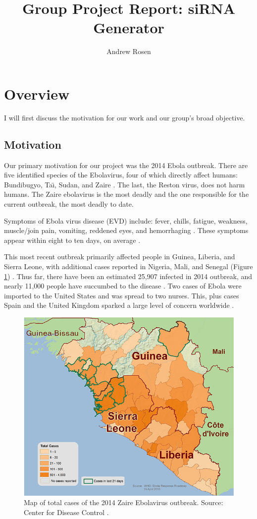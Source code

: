 \documentclass[10pt,letterpaper]{article}
\author{Andrew Rosen}
\title{Group Project Report: siRNA Generator}
\date{}
\begin{document}
\maketitle

\section{Overview}
I will first discuss the motivation for our work and our group's broad objective.


\subsection{Motivation}
Our primary motivation for our project was the 2014 Ebola outbreak.
There are five identified species of the Ebolavirus, four of which directly affect humans: Bundibugyo, Ta\"{\i}, Sudan, and Zaire \cite{centers20152014}.
The last, the Reston virus, does not harm humans.
The Zaire ebolavirus is the most deadly and the one responsible for the current outbreak, the most deadly to date.

Symptoms of Ebola virus disease (EVD) include: fever, chills, fatigue, weakness, muscle/join pain,  vomiting, reddened eyes, and hemorrhaging \cite{team2014ebola} \cite{wongcharacterization}.
These symptoms appear within eight to ten days, on average \cite{centers20152014}.

This most recent outbreak primarily affected people in Guinea, Liberia, and Sierra Leone, with additional cases reported in Nigeria, Mali, and Senegal (Figure \ref{fig:west-africa-distribution-map}) \cite{centers20152014}.
Thus far, there have been an estimated 25,907 infected in 2014 outbreak, and nearly 11,000 people have succumbed to the disease \cite{centers20152014}.
Two cases of Ebola were imported to the United States and was spread to two nurses. 
This, plus cases Spain and the United Kingdom sparked a large level of concern worldwide  \cite{levin2015ebola} \cite{ready}.

\begin{figure}
\centering
\includegraphics[width=0.5\linewidth]{west-africa-distribution-map}
\caption{Map of total cases of the 2014 Zaire Ebolavirus outbreak. Source: Center for Disease Control \cite{centers20152014}.}
\label{fig:west-africa-distribution-map}
\end{figure}
\end{document}
